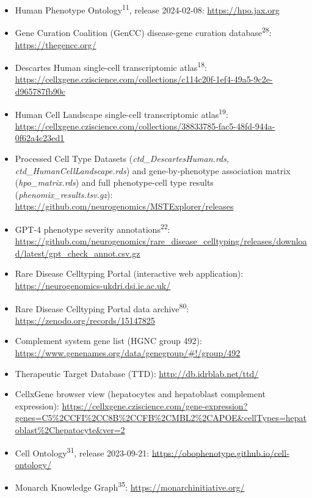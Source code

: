 \documentclass[
]{article}
\providecommand{\tightlist}{%
  \setlength{\itemsep}{0pt}\setlength{\parskip}{0pt}}
\begin{document}
\begin{itemize}
\tightlist
\item
  Human Phenotype Ontology\textsuperscript{11}, release 2024-02-08:
  \url{https://hpo.jax.org}
\item
  Gene Curation Coalition (GenCC) disease-gene curation
  database\textsuperscript{28}: \url{https://thegencc.org/}
\item
  Descartes Human single-cell transcriptomic atlas\textsuperscript{18}:
  \url{https://cellxgene.cziscience.com/collections/c114c20f-1ef4-49a5-9c2e-d965787fb90c}
\item
  Human Cell Landscape single-cell transcriptomic
  atlas\textsuperscript{19}:
  \url{https://cellxgene.cziscience.com/collections/38833785-fac5-48fd-944a-0f62a4c23ed1}
\item
  Processed Cell Type Datasets (\emph{ctd\_DescartesHuman.rds},
  \emph{ctd\_HumanCellLandscape.rds}) and gene-by-phenotype association
  matrix (\emph{hpo\_matrix.rds}) and full phenotype-cell type results
  (\emph{phenomix\_results.tsv.gz}):
  \url{https://github.com/neurogenomics/MSTExplorer/releases}
\item
  GPT-4 phenotype severity annotations\textsuperscript{22}:
  \url{https://github.com/neurogenomics/rare_disease_celltyping/releases/download/latest/gpt_check_annot.csv.gz}
\item
  Rare Disease Celltyping Portal (interactive web application):
  \url{https://neurogenomics-ukdri.dsi.ic.ac.uk/}
\item
  Rare Disease Celltyping Portal data archive\textsuperscript{80}:
  \url{https://zenodo.org/records/15147825}
\item
  Complement system gene list (HGNC group 492):
  \url{https://www.genenames.org/data/genegroup/\#!/group/492}
\item
  Therapeutic Target Database (TTD): \url{http://db.idrblab.net/ttd/}
\item
  CellxGene browser view (hepatocytes and hepatoblast complement
  expression):
  \url{https://cellxgene.cziscience.com/gene-expression?genes=C5\%2CCFI\%2CC8B\%2CCFB\%2CMBL2\%2CAPOE&cellTypes=hepatoblast\%2Chepatocyte&ver=2}
\item
  Cell Ontology\textsuperscript{31}, release 2023-09-21:
  \url{https://obophenotype.github.io/cell-ontology/}
\item
  Monarch Knowledge Graph\textsuperscript{35}:
  \url{https://monarchinitiative.org/}
\end{itemize}
\end{document}
